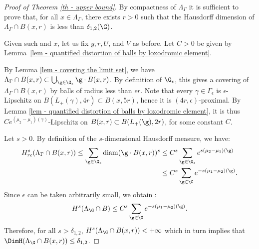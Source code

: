 \begin{proof}[Proof of Theorem \ref{th - upper bound}]
By compactness of $\Lambda_\Gamma$ it is sufficient to prove that, for all $x\in \Lambda_\Gamma$, there exists $r>0$ such that the Hausdorff dimension of $\Lambda_\Gamma \cap B(x,r)$ is less than $ \delta_{1,2}(\G)$.

Given such and $x$, let us fix $y, r, U$, and $V$ as before. Let $C>0$ be given by Lemma~\ref{lem - quantified distortion of balls by loxodromic element}.

By Lemma \ref{lem - covering the limit set}, we have $\Lambda_\Gamma\cap B(x,r) \subset \bigcup_{\g \in \G_\epsilon} \g \cdot B(x,r)$. By definition of $\G_\epsilon$, this gives a covering of $\Lambda_\Gamma\cap B(x,r)$ by balls of radius less than $\epsilon r$.
Note that every $\gamma \in \Gamma_\epsilon$ is $\epsilon$-Lipschitz on $B(L_+(\gamma), 4r) \subset B(x,5r)$, hence it is $(4r,\epsilon)$\nobreakdash-prox\-imal. By Lemma \ref{lem - quantified distortion of balls by loxodromic element}, it is thus $Ce^{(\mu_2-\mu_1)(\gamma)}$-Lipschitz on $B(x,r) \subset B(L_+(\g),2r)$, for some constant $C$.

Let $s>0$. By definition of the $s$-dimensional Hausdorff measure, we have:
\begin{align*}
H^{s}_{r\epsilon} (\Lambda_\Gamma \cap B(x,r))\leq \sum_{\g\in \G_\epsilon} \mathrm{diam}(\g \cdot B(x,r)) ^s
& \leq C^s \sum_{\g\in \G_\epsilon} e^{s(\mu_2- \mu_1)(\g)}\\
&\leq C^s \sum_{\g\in \G} e^{-s(\mu_1- \mu_2) (\g)}.
\end{align*}
Since $\epsilon$ can be taken arbitrarily small, we obtain :
\[H^{s} (\Lambda_\G \cap B)\leq C^s \sum_{\g\in \G} e^{-s(\mu_1- \mu_2) (\g)}.\]
Therefore, for all $s>\delta_{1,2}$,
$H^{s} (\Lambda_\G \cap B(x,r))<+\infty$ which in turn implies that $\DimH(\Lambda_\G\cap B(x,r)) \leq \delta_{1,2}$.
\end{proof}

